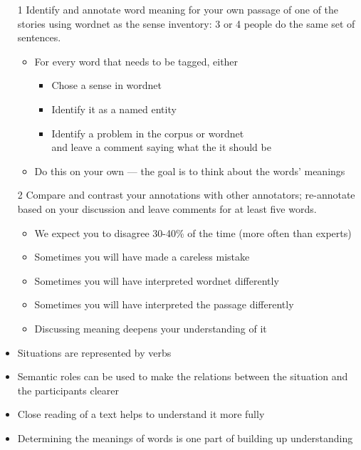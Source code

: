 \documentclass[a4paper,landscape,headrule,footrule,xetex]{foils}
\begin{document}
\begin{itemize}
\item[1] Identify and annotate word meaning for your own passage of
  one of the stories using wordnet as the sense inventory: 3 or 4 people do
  the same set of sentences.
  \begin{itemize}
  \item For every word that needs to be tagged, either
    \begin{itemize}
    \item Chose a sense in wordnet
    \item Identify it as a named entity
    \item Identify a problem in the corpus or wordnet
      \\ and leave a comment saying what the it should be
    \end{itemize}
  \item Do this on your own --- the goal is to think about the words' meanings
  \end{itemize}
\item[2] Compare and contrast your annotations with other annotators;
  re-annotate based on your discussion and leave comments for at least
  five words.
  \begin{itemize}
  \item We expect you to disagree 30-40\% of the time (more often than experts)
  \item Sometimes you will have made a careless mistake
  \item Sometimes you will have interpreted wordnet differently
  \item Sometimes you will have interpreted the passage differently
  \item Discussing meaning deepens your understanding of it
  \end{itemize}
\end{itemize}


\begin{itemize}
\item Situations are represented by verbs
\item Semantic roles can be used to make the relations between the situation and the participants clearer
\item Close reading of a text helps to understand it more fully
\item Determining the meanings of words is one part of building up
  understanding
\end{itemize}
\end{document}
